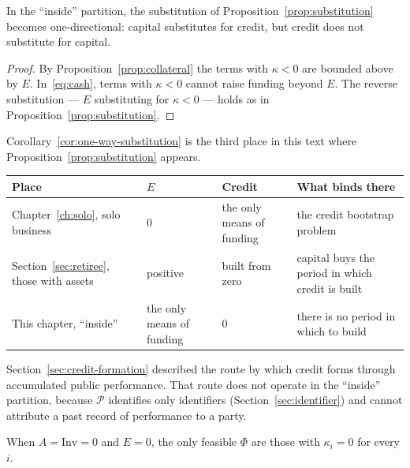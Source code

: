 \begin{corollary}
\label{cor:one-way-substitution}
In the ``inside'' partition, the substitution of Proposition~\ref{prop:substitution} becomes
one-directional: capital substitutes for credit, but credit does not substitute for capital.
\end{corollary}

\begin{proof}
By Proposition~\ref{prop:collateral} the terms with $\kappa<0$ are bounded above by $E$.
In~\eqref{eq:cash}, terms with $\kappa<0$ cannot raise funding beyond $E$. The reverse
substitution --- $E$ substituting for $\kappa<0$ --- holds as in
Proposition~\ref{prop:substitution}.
\end{proof}

Corollary~\ref{cor:one-way-substitution} is the third place in this text where
Proposition~\ref{prop:substitution} appears.

\begin{center}
\begin{tabularx}{\textwidth}{@{}lllX@{}}
\toprule
Place & $E$ & Credit & What binds there \\
\midrule
Chapter~\ref{ch:solo}, solo business & 0 & the only means of funding & the credit bootstrap problem \\
Section~\ref{sec:retiree}, those with assets & positive & built from zero & capital buys the period in which credit is built \\
This chapter, ``inside'' & the only means of funding & 0 & there is no period in which to build \\
\bottomrule
\end{tabularx}
\label{tab:substitution-three-points}
\end{center}

Section~\ref{sec:credit-formation} described the route by which credit forms through
accumulated public performance. That route does not operate in the ``inside'' partition,
because $\mathcal{P}$ identifies only identifiers (Section~\ref{sec:identifier}) and cannot
attribute a past record of performance to a party.

\begin{corollary}
\label{cor:exclusion}
When $A=\mathrm{Inv}=0$ and $E=0$, the only feasible $\Phi$ are those with $\kappa_i=0$ for
every $i$.
\end{corollary}

